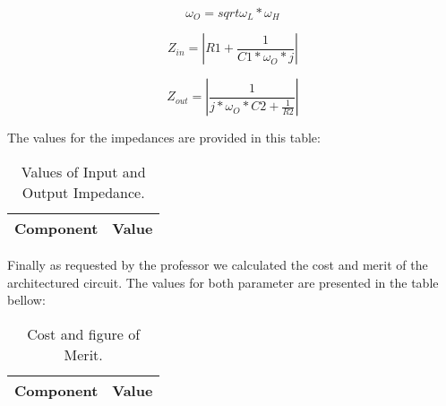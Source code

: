 \begin{equation}
\omega_O = sqrt{\omega_L * \omega_H}
\end{equation}

\begin{equation}
Z_{in} = |R1 + \frac{1}{C1*\omega_O *j}|
\end{equation}

\begin{equation}
Z_{out} = |\frac{1}{j*\omega_O*C2 + \frac{1}{R2}}|
\end{equation}

The values for the impedances are provided in this table:

\begin{table}[h]
  \centering
  \begin{tabular}{|l|r|}
    \hline    
    {\bf Component} & {\bf Value} \\ \hline
    
  \end{tabular}
  \caption{Values of Input and Output Impedance.}
  \label{tab:aimped}
\end{table}

Finally as requested by the professor we calculated the cost and merit of the architectured circuit. The values for both parameter are presented in the table bellow:

\begin{table}[h]
  \centering
  \begin{tabular}{|l|r|}
    \hline    
    {\bf Component} & {\bf Value} \\ \hline
    
  \end{tabular}
  \caption{Cost and figure of Merit.}
  \label{tab:amerit}
\end{table}

